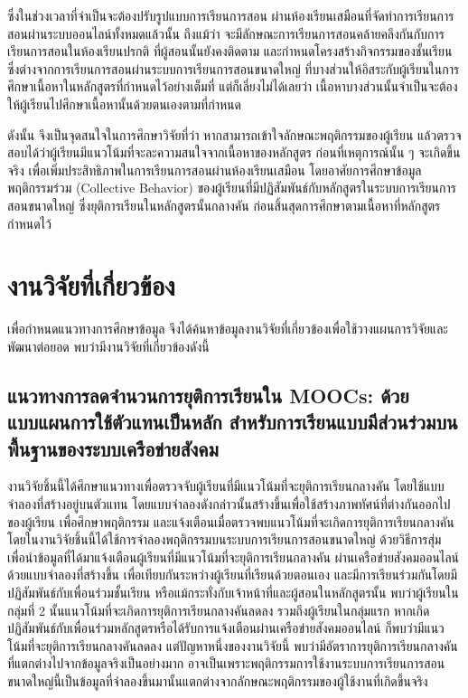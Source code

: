 \documentclass[conference]{IEEEtran}
\def\moocs{การเรียนการสอนขนาดใหญ่}
\def\MOOCs{ระบบ{\moocs}}
\def\dropout{ยุติการเรียนกลางคัน}
\begin{document}
    ซึ่งในช่วงเวลาที่จำเป็นจะต้องปรับรูปแบบการเรียนการสอน 
    ผ่านห้องเรียนเสมือนที่จัดทำการเรียนการสอนผ่านระบบออนไลน์ทั้งหมดแล้วนั้น
    ถึงแม้ว่า จะมีลักษณะการเรียนการสอนคล้ายคลึงกันกับการเรียนการสอนในห้องเรียนปรกติ
    ที่ผู้สอนนั้นยังคงติดตาม และกำหนดโครงสร้างกิจกรรมของชั้นเรียน 
    ซึ่งต่างจากการเรียนการสอนผ่านระบบการเรียนการสอนขนาดใหญ่ 
    ที่บางส่วนให้อิสระกับผู้เรียนในการศึกษาเนื้อหาในหลักสูตรที่กำหนดไว้อย่างเต็มที่ 
    แต่ก็เลี่ยงไม่ได้เลยว่า เนื้อหาบางส่วนนั้นจำเป็นจะต้องให้ผู้เรียนไปศึกษาเนื้อหานั้นด้วยตนเองตามที่กำหนด
    
    ดังนั้น จึงเป็นจุดสนใจในการศึกษาวิจัยที่ว่า หากสามารถเข้าใจลักษณะพฤติกรรมของผู้เรียน
    แล้วตรวจสอบได้ว่าผู้เรียนมีแนวโน้มที่จะละความสนใจจากเนื้อหาของหลักสูตร
    ก่อนที่เหตุการณ์นั้น ๆ จะเกิดขึ้นจริง เพื่อเพิ่มประสิทธิภาพในการเรียนการสอนผ่านห้องเรียนเสมือน
    โดยอาศัยการศึกษาข้อมูลพฤติกรรมร่วม (Collective Behavior) 
    \cite{mooc:collectivebehavior} ของผู้เรียนที่มีปฏิสัมพันธ์กับหลักสูตรใน{\MOOCs} 
    ซึ่งยุติการเรียนในหลักสูตรนั้นกลางคัน ก่อนสิ้นสุดการศึกษาตามเนื้อหาที่หลักสูตรกำหนดไว้

    \section{งานวิจัยที่เกี่ยวข้อง}

    เพื่อกำหนดแนวทางการศึกษาข้อมูล 
    จึงได้ค้นหาข้อมูลงานวิจัยที่เกี่ยวข้องเพื่อใช้วางแผนการวิจัยและพัฒนาต่อยอด 
    พบว่ามีงานวิจัยที่เกี่ยวข้องดังนี้

    \subsection{แนวทางการลดจำนวนการยุติการเรียนใน MOOCs: ด้วยแบบแผนการใช้ตัวแทนเป็นหลัก สำหรับการเรียนแบบมีส่วนร่วมบนพื้นฐานของระบบเครือข่ายสังคม \cite{paper:8924433}}
    งานวิจัยชิ้นนี้ได้ศึกษาแนวทางเพื่อตรวจจับผู้เรียนที่มีแนวโน้มที่จะ{\dropout} โดยใช้แบบจำลองที่สร้างอยู่บนตัวแทน
    โดยแบบจำลองดังกล่าวนั้นสร้างขึ้นเพื่อใช้สร้างภาพทัศน์ที่ต่างกันออกไปของผู้เรียน 
    เพื่อศึกษาพฤติกรรม และแจ้งเตือนเมื่อตรวจพบแนวโน้มที่จะเกิดการ{\dropout} 
    โดยในงานวิจัยชิ้นนี้ได้ใช้การจำลองพฤติกรรมบน{\MOOCs} ด้วยวิธีการสุ่ม
    เพื่อนำข้อมูลที่ได้มาแจ้งเตือนผู้เรียนที่มีแนวโน้มที่จะ{\dropout} 
    ผ่านเครือข่ายสังคมออนไลน์ ด้วยแบบจำลองที่สร้างขึ้น 
    เพื่อเทียบกันระหว่างผู้เรียนที่เรียนด้วยตอนเอง และมีการเรียนร่วมกันโดยมีปฏิสัมพันธ์กับเพื่อนร่วมชั้นเรียน 
    หรือแม้กระทั่งกับเจ้าหน้าที่และผู้สอนในหลักสูตรนั้น
    พบว่าผู้เรียนในกลุ่มที่ 2 นั้นแนวโน้มที่จะเกิดการ{\dropout}ลดลง 
    รวมถึงผู้เรียนในกลุ่มแรก หากเกิดปฏิสัมพันธ์กับเพื่อนร่วมหลักสูตรหรือได้รับการแจ้งเตือนผ่านเครือข่ายสังคมออนไลน์
    ก็พบว่ามีแนวโน้มที่จะ{\dropout}ลดลง แต่ปัญหาหนึ่งของงานวิจัยนี้ พบว่ามีอัตราการ{\dropout} 
    ที่แตกต่างไปจากข้อมูลจริงเป็นอย่างมาก 
    อาจเป็นเพราะพฤติกรรมการใช้งาน{\MOOCs}นี้เป็นข้อมูลที่จำลองขึ้นมานั้นแตกต่างจากลักษณะพฤติกรรมของผู้ใช้งานที่เกิดขึ้นจริง
\end{document}
